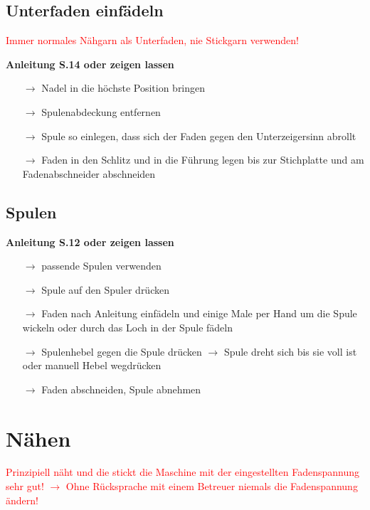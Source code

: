 \documentclass{\basedir/fablab-document}
\begin{document}
\subsection{Unterfaden einfädeln}
\textcolor{red}{Immer normales Nähgarn als Unterfaden, nie Stickgarn verwenden!}

\vspace{1em}
\textbf{Anleitung S.14 oder zeigen lassen}
\begin{itemize}
 \item[$\rightarrow$] Nadel in die höchste Position bringen
 \item[$\rightarrow$] Spulenabdeckung entfernen
 \item[$\rightarrow$] Spule so einlegen, dass sich der Faden gegen den Unterzeigersinn abrollt
 \item[$\rightarrow$] Faden in den Schlitz und in die Führung legen bis zur Stichplatte und am Fadenabschneider abschneiden
\end{itemize}

\subsection{Spulen}
\textbf{Anleitung S.12 oder zeigen lassen}
\begin{itemize}
 \item[$\rightarrow$] passende Spulen verwenden
 \item[$\rightarrow$] Spule auf den Spuler drücken
 \item[$\rightarrow$] Faden nach Anleitung einfädeln und einige Male per Hand um die Spule wickeln oder durch das Loch in der Spule fädeln
 \item[$\rightarrow$] Spulenhebel gegen die Spule drücken $\rightarrow$ Spule dreht sich bis sie voll ist oder manuell Hebel wegdrücken
 \item[$\rightarrow$] Faden abschneiden, Spule abnehmen
\end{itemize}

\pagebreak
\section{Nähen}

\textcolor{red}{Prinzipiell näht und die stickt die Maschine mit der eingestellten Fadenspannung sehr gut! }
\textcolor{red}{\newline $\rightarrow$ Ohne Rücksprache mit einem Betreuer niemals die Fadenspannung ändern!}

\vspace{1em}
\end{document}
